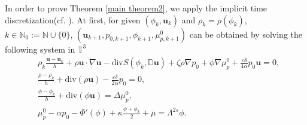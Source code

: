 \documentclass[reqno,a4paper,11pt]{amsart}
\theoremstyle{plain}
\numberwithin{equation}{section}
\begin{document}
In order to prove Theorem \ref{main theorem2}, we apply the implicit time discretization(cf. \cite{AH,ADG}). At first, for given $(\phi_{k}, \mathbf{u}_{k})$ and $\rho_{k}=\rho(\phi_{k})$, $k\in \mathbb{N}_{0}:=\mathbb{N}\cup\{0\}$, $(\mathbf{u}_{k+1},p_{0,k+1},\phi_{k+1},\mu_{p,k+1}^{0})$ can be obtained by solving the following system in $\mathbb{T}^{3}$
\begin{align}\label{im1}
	&\rho_{k}\frac{\mathbf{u}-\mathbf{u}_{k}}{h}+\rho\mathbf{u}\cdot\nabla\mathbf{u}-\mathrm{div}S(\phi_{k},\mathbb{ D}\mathbf{u})
	+\zeta\rho \nabla p_{0}+\phi \nabla \mu_{p}^{0}
	+\frac{\varepsilon\delta}{4\alpha}p_{0} \mathbf{u}=0, \\
	\label{im2}
	&\frac{\rho-\rho_{k}}{h}+\mathrm{div} (\rho \mathbf{u})-\frac{\varepsilon\delta}{2\alpha} p_{0}=0, 
	\\  \label{im2-1}&\frac{\phi-\phi_{k}}{h}+\mathrm{div}(\phi\mathbf{u})= \Delta\mu_{p}^{0}, \\
	\label{im3}
	&\mu_{p}^{0}-\alpha p_{0}-\Phi'(\phi)+\kappa\frac{\phi+\phi_{k}}{2}+\overline{\mu}=\Lambda^{2s}\phi.
\end{align}


\end{document}
